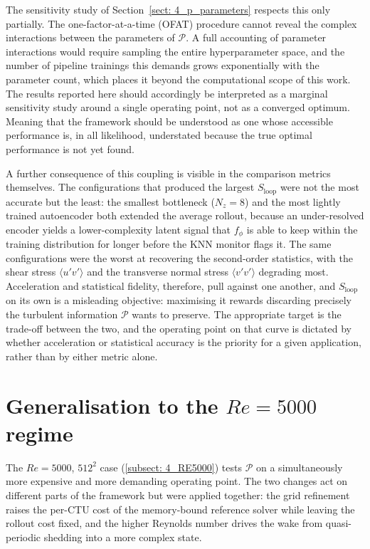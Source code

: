 The sensitivity study of Section~\ref{sect: 4_p_parameters} respects this only partially. The one-factor-at-a-time (OFAT) procedure cannot reveal the complex interactions between the parameters of $\mathcal{P}$. A full accounting of parameter interactions would require sampling the entire hyperparameter space, and the number of pipeline trainings this demands grows exponentially with the parameter count, which places it beyond the computational scope of this work. The results reported here should accordingly be interpreted as a marginal sensitivity study around a single operating point, not as a converged optimum. Meaning that the framework should be understood as one whose accessible performance is, in all likelihood, understated because the true optimal performance is not yet found. 

A further consequence of this coupling is visible in the comparison metrics themselves. The configurations that produced the largest $S_\text{loop}$ were not the most accurate but the least: the smallest bottleneck ($N_z = 8$) and the most lightly trained autoencoder both extended the average rollout, because an under-resolved encoder yields a lower-complexity latent signal that $f_\phi$ is able to keep within the training distribution for longer before the KNN monitor flags it. The same configurations were the worst at recovering the second-order statistics, with the shear stress $\langle u'v'\rangle$ and the transverse normal stress $\langle v'v'\rangle$ degrading most. Acceleration and statistical fidelity, therefore, pull against one another, and $S_\text{loop}$ on its own is a misleading objective: maximising it rewards discarding precisely the turbulent information $\mathcal{P}$ wants to preserve. The appropriate target is the trade-off between the two, and the operating point on that curve is dictated by whether acceleration or statistical accuracy is the priority for a given application, rather than by either metric alone.

\section{Generalisation to the \texorpdfstring{$Re=5000$}{Re=5000} regime}
\label{sect: disc_re5000}

The $Re=5000$, $512^2$ case (\autoref{subsect: 4_RE5000}) tests $\mathcal{P}$ on a simultaneously more expensive and more demanding operating point. The two changes act on different parts of the framework but were applied together: the grid refinement raises the per-CTU cost of the memory-bound reference solver while leaving the rollout cost fixed, and the higher Reynolds number drives the wake from quasi-periodic shedding into a more complex state. 

